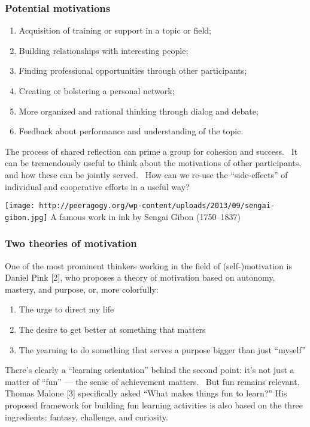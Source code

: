 \subsubsection{Potential motivations}

\begin{enumerate}
\itemsep1pt\parskip0pt
\item
  Acquisition of training or support in a topic or field;
\item
  Building relationships with interesting people;
\item
  Finding professional opportunities through other participants;
\item
  Creating or bolstering a personal network;
\item
  More organized and rational thinking through dialog and debate;
\item
  Feedback about performance and understanding of the topic.
\end{enumerate}

The process of shared reflection can prime a group for cohesion and
success.~ It can be tremendously useful to think about the motivations
of other participants, and how these can be jointly served.~ How can we
re-use the ``side-effects'' of individual and cooperative efforts in a
useful way?

\texttt{[image: http://peeragogy.org/wp-content/uploads/2013/09/sengai-gibon.jpg]}
A famous work in ink by Sengai Gibon (1750--1837)

\subsubsection{Two theories of motivation}

One of the most prominent thinkers working in the field of
(self-)motivation is Daniel Pink {[}2{]}, who proposes a theory of
motivation based on autonomy, mastery, and purpose, or, more colorfully:

\begin{enumerate}
\itemsep1pt\parskip0pt
\item
  The urge to direct my life
\item
  The desire to get better at something that matters
\item
  The yearning to do something that serves a purpose bigger than just
  ``myself''
\end{enumerate}

There's clearly a ``learning orientation'' behind the second point: it's
not just a matter of ``fun'' --- the sense of achievement matters.~ But
fun remains relevant. Thomas Malone {[}3{]} specifically asked ``What
makes things fun to learn?'' His proposed framework for building fun
learning activities is also based on the three ingredients: fantasy,
challenge, and curiosity.

